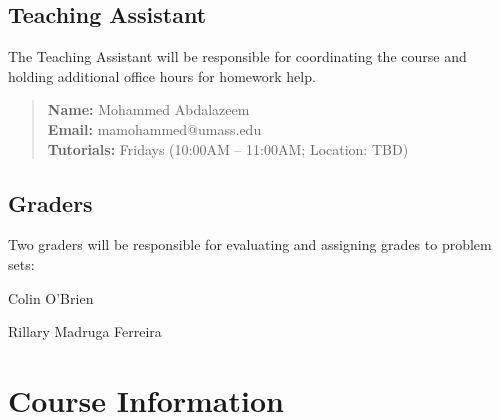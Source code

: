 \documentclass[11pt,twoside]{article}
\numberwithin{equation}{section}
\newcommand{\?}{\stackrel{?}{=}}
\begin{document}
\subsection{Teaching Assistant}
The Teaching Assistant will be responsible for coordinating the course and holding additional office hours for homework help.
\begin{quote}\small
   \textbf{Name:} Mohammed Abdalazeem\\
   \textbf{Email:} mamohammed@umass.edu\\
   \textbf{Tutorials:} Fridays (10:00AM -- 11:00AM; Location: TBD)
   \end{quote}

\subsection{Graders}
Two graders  will be responsible for evaluating and assigning grades to problem sets:
\begin{compactitem}\small
	\item Colin O'Brien
	\item Rillary Madruga Ferreira 
\end{compactitem} 



\section{Course Information}
\end{document}

